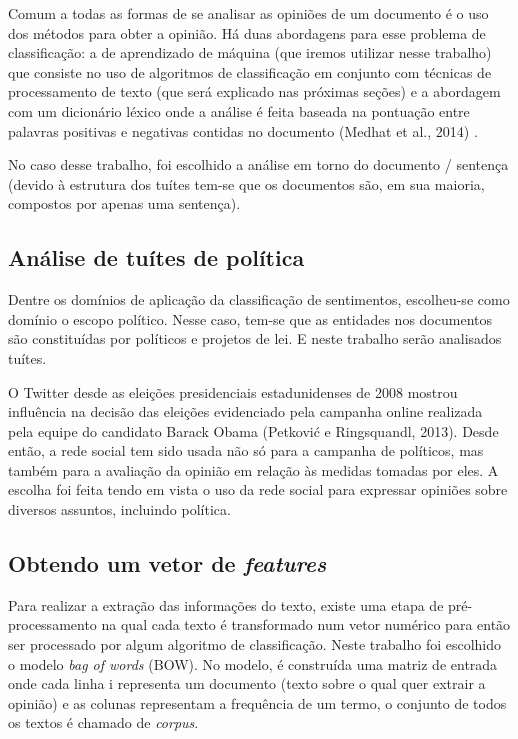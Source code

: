 Comum a todas as formas de se analisar as opiniões de um documento é o uso dos métodos
para obter a opinião. Há duas abordagens para esse problema de classificação: a de aprendizado
de máquina (que iremos utilizar nesse trabalho) que consiste no uso de algoritmos de 
classificação em conjunto com técnicas de processamento de texto (que será explicado nas próximas
seções) e a abordagem com um dicionário léxico onde a análise é feita baseada na pontuação
entre palavras positivas e negativas contidas no documento (Medhat et al., 2014) \citep{medhat2014}.

No caso desse trabalho, foi escolhido a análise em torno do documento / sentença (devido à estrutura
dos tuítes tem-se que os documentos são, em sua maioria, compostos por apenas uma 
sentença). 

\subsection{Análise de tuítes de política}

Dentre os domínios de aplicação da classificação de sentimentos, escolheu-se como domínio o
escopo político. Nesse caso, tem-se que as entidades nos documentos são constituídas por
políticos e projetos de lei. E neste trabalho serão analisados tuítes.

O Twitter desde as eleições presidenciais estadunidenses de 2008 mostrou influência
na decisão das eleições evidenciado pela campanha online realizada pela equipe do
candidato Barack Obama (Petković e Ringsquandl, 2013)\citep{petkovic2013}. Desde então, 
a rede social tem sido usada não só para a campanha de políticos, mas também para a avaliação
da opinião em relação às medidas tomadas por eles. 
A escolha foi feita tendo em vista o uso da rede social 
para expressar opiniões sobre diversos assuntos, incluindo política.


\subsection{Obtendo um vetor de \textit{features}}
\label{subsec:featurization}

Para realizar a extração das informações do texto, existe uma etapa de pré-processamento na qual
cada texto é transformado num vetor numérico para então ser processado por algum algoritmo de
classificação. Neste trabalho foi escolhido o modelo \textit{bag of words} (BOW). No modelo, 
é construída uma matriz de entrada onde cada linha i representa um documento (texto sobre o qual
quer extrair a opinião) e as colunas representam a frequência de um termo, o conjunto de todos os textos é chamado de \textit{corpus}.

